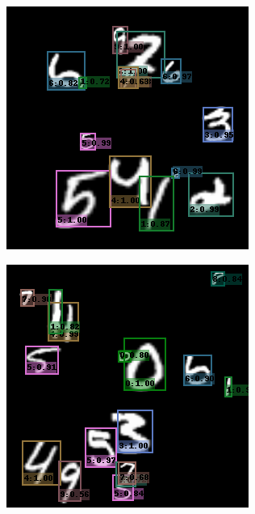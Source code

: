\begin{figure}[h!]
\begin{subfigure}[b]{0.193\textwidth}
    \end{subfigure}
    \hfill
    \begin{subfigure}[b]{0.193\textwidth}
        \centering
        \includegraphics[width=\textwidth]{Images/mnist_output/12.png}
    \end{subfigure}
    \hfill
    \begin{subfigure}[b]{0.193\textwidth}
        \centering
        \includegraphics[width=\textwidth]{Images/mnist_output/13.png}

\end{subfigure}
\end{figure}
